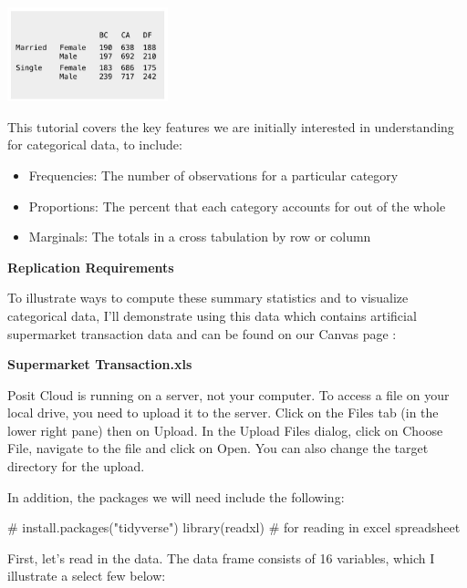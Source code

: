 \documentclass[
  letterpaper,
  DIV=11,
  numbers=noendperiod]{scrreprt}
\newenvironment{Shaded}{\begin{snugshade}}{\end{snugshade}}
\newcommand{\CommentTok}[1]{\textcolor[rgb]{0.37,0.37,0.37}{#1}}
\newcommand{\FunctionTok}[1]{\textcolor[rgb]{0.28,0.35,0.67}{#1}}
\newcommand{\NormalTok}[1]{\textcolor[rgb]{0.00,0.23,0.31}{#1}}
\providecommand{\tightlist}{%
  \setlength{\itemsep}{0pt}\setlength{\parskip}{0pt}}\usepackage{longtable,booktabs,array}
\begin{document}
\includegraphics[width=0.35\textwidth,height=\textheight]{./images/Daily-6-Pic-1.jpg}

This tutorial covers the key features we are initially interested in
understanding for categorical data, to include:

\begin{itemize}
\tightlist
\item
  Frequencies: The number of observations for a particular category
\item
  Proportions: The percent that each category accounts for out of the
  whole
\item
  Marginals: The totals in a cross tabulation by row or column
\end{itemize}

\textbf{Replication Requirements}

To illustrate ways to compute these summary statistics and to visualize
categorical data, I'll demonstrate using this data which contains
artificial supermarket transaction data and can be found on our Canvas
page :

\textbf{Supermarket Transaction.xls}

Posit Cloud is running on a server, not your computer. To access a file
on your local drive, you need to upload it to the server. Click on the
Files tab (in the lower right pane) then on Upload. In the Upload Files
dialog, click on Choose File, navigate to the file and click on Open.
You can also change the target directory for the upload.

In addition, the packages we will need include the following:

\begin{Shaded}
\begin{Highlighting}[]
\CommentTok{\# install.packages("tidyverse")}
\FunctionTok{library}\NormalTok{(readxl)                   }\CommentTok{\# for reading in excel spreadsheet}
\end{Highlighting}
\end{Shaded}

First, let's read in the data. The data frame consists of 16 variables,
which I illustrate a select few below:
\end{document}
